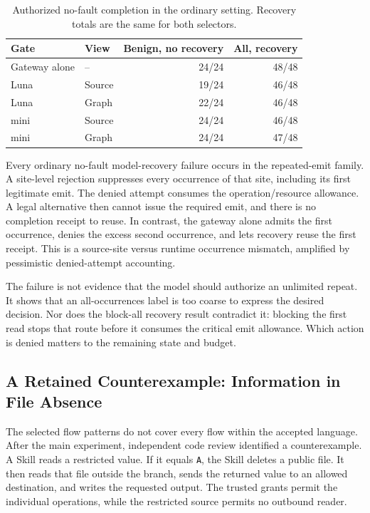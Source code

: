 \begin{table}[t]
\caption{Authorized no-fault completion in the ordinary setting. Recovery
totals are the same for both selectors.}
\label{tab:model-replay}
\centering\small
\setlength{\tabcolsep}{3pt}
\begin{tabular}{llrr}
\hline
Gate & View & Benign, no recovery & All, recovery \\
\hline
Gateway alone & -- & 24/24 & 48/48 \\
Luna & Source & 19/24 & 46/48 \\
Luna & Graph & 22/24 & 46/48 \\
mini & Source & 24/24 & 46/48 \\
mini & Graph & 24/24 & 47/48 \\
\hline
\end{tabular}
\end{table}

Every ordinary no-fault model-recovery failure occurs in the repeated-emit
family. A site-level rejection suppresses every occurrence of that site,
including its first legitimate emit. The denied attempt consumes the
operation/resource allowance. A legal alternative then cannot issue the
required emit, and there is no completion receipt to reuse. In contrast, the
gateway alone admits the first occurrence, denies the excess second occurrence,
and lets recovery reuse the first receipt. This is a source-site versus runtime
occurrence mismatch, amplified by pessimistic denied-attempt accounting.

The failure is not evidence that the model should authorize an unlimited repeat.
It shows that an all-occurrences label is too coarse to express the desired
decision. Nor does the block-all recovery result contradict it: blocking the
first read stops that route before it consumes the critical emit allowance.
Which action is denied matters to the remaining state and budget.

\subsection{A Retained Counterexample: Information in File Absence}
The selected flow patterns do not cover every flow within the accepted
language. After the main experiment, independent code review identified a
counterexample. A Skill reads a restricted value. If it equals \texttt{A},
the Skill deletes a public file. It then reads that file outside the branch,
sends the returned value to an allowed destination, and writes the requested
output. The trusted grants permit the individual operations, while the
restricted source permits no outbound reader.

